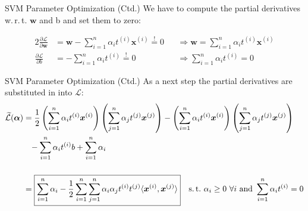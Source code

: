 \begin{frame}{SVM Parameter Optimization (Ctd.)}{}\important
	We have to compute the partial derivatives w.\,r.\,t. $\bm{w}$ and b and set them to zero:
		
	\begin{alignat}{2}
		\frac{\partial \mathcal{L}}{\partial \bm{w}}
			&= \bm{w} - \sum_{i=1}^n \alpha_i t^{(i)} \bm{x}^{(i)} \overset{!}{=} 0
				&&\Rightarrow \boxed{\bm{w} = \sum_{i=1}^n \alpha_i t^{(i)} \bm{x}^{(i)}} \\[5mm]
		\frac{\partial \mathcal{L}}{\partial b} 
			&= -\sum_{i=1}^n \alpha_i t^{(i)} \overset{!}{=} 0
				&&\Rightarrow \boxed{\sum_{i=1}^n \alpha_i t^{(i)} = 0}
	\end{alignat}
\end{frame}


\begin{frame}{SVM Parameter Optimization (Ctd.)}{}\optional
	As a next step the partial derivatives are substituted in into $\mathcal{L}$:
	\footnotesize
	\begin{align}
		\nonumber
		\widetilde{\mathcal{L}}(\bm{\alpha})
		&=
			\frac{1}{2} \left( \sum_{i=1}^n \alpha_i t^{(i)} \bm{x}^{(i)} \right)\left( \sum_{j=1}^n \alpha_j t^{(j)} \bm{x}^{(j)} \right) -
			\left( \sum_{i=1}^n \alpha_i t^{(i)} \bm{x}^{(i)} \right) \left( \sum_{j=1}^n \alpha_j t^{(j)} \bm{x}^{(j)} \right) \\
		&\phantom{=} - \sum_{i=1}^n \alpha_i t^{(i)} b + \sum_{i=1}^n \alpha_i \\[5mm]
		&=
			\boxed{
				\sum_{i=1}^n \alpha_i - \frac{1}{2} \sum_{i=1}^n \sum_{j=1}^n
					\alpha_i \alpha_j t^{(i)} t^{(j)} \langle \bm{x}^{(i)}, \bm{x}^{(j)} \rangle
			} \quad \text{s.\,t.}\ \alpha_i \ge 0\ \forall i\ \text{and}\ \sum_{i=1}^n \alpha_i t^{(i)} = 0
	\end{align}
	\normalsize
\end{frame}


